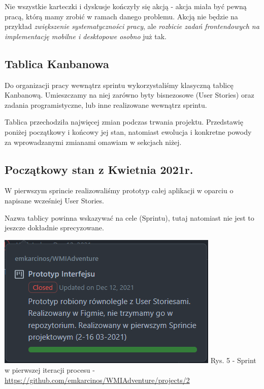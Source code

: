 \documentclass{article}
\begin{document}
Nie wszystkie karteczki i dyskusje kończyły się akcją - akcja miała być pewną pracą, którą mamy zrobić w ramach danego problemu. Akcją nie będzie na przykład \textit{zwiększenie systematyczności pracy}, ale \textit{rozbicie zadań frontendowych na implementację mobilne i desktopowe osobno} już tak.

\subsection{Tablica Kanbanowa}
Do organizacji pracy wewnątrz sprintu wykorzystaliśmy klasyczną tablicę Kanbanową. Umieszczamy na niej zarówno byty bisnezosowe (User Stories) oraz zadania programistyczne, lub inne realizowane wewnątrz sprintu.

Tablica przechodziła najwięcej zmian podczas trwania projektu. Przedstawię poniżej początkowy i końcowy jej stan, natomiast ewolucja i konkretne powody za wprowadzanymi zmianami omawiam w sekcjach niżej.

\subsection*{Początkowy stan z Kwietnia 2021r.}
W pierwszym sprincie realizowaliśmy prototyp całej aplikacji w oparciu o napisane wcześniej User Stories.

Nazwa tablicy powinna wskazywać na cele (Sprintu), tutaj natomiast nie jest to jeszcze dokładnie sprecyzowane.

\begin{center}
    \includegraphics[scale=0.9]{old_sprint.png}
    \newline
    Rys. 5 - Sprint w pierwszej iteracji procesu - \url{https://github.com/emkarcinos/WMIAdventure/projects/2}
\end{center}
\end{document}
